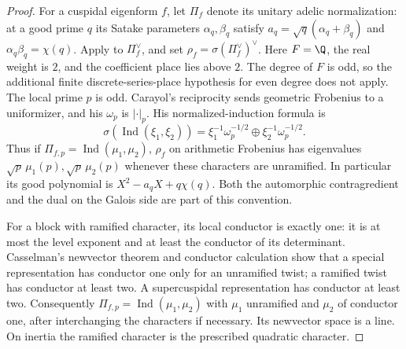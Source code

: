 \begin{proof}
For a cuspidal eigenform $f$, let $\Pi_f$ denote its unitary
adelic normalization: at a good prime $q$ its Satake parameters
$\alpha_q,\beta_q$ satisfy
$a_q=\sqrt q(\alpha_q+\beta_q)$ and
$\alpha_q\beta_q=\chi(q)$.
Apply \cite[\S\S0.3--0.7, Theorem~A, pp.~409--411]{carayol}
to $\Pi_f^\vee$, and set $\rho_f=\sigma(\Pi_f^\vee)^\vee$.
Here $F=\Q$, the real weight is $2$, and the coefficient place
lies above $2$. The degree of $F$ is odd, so the additional
finite discrete-series-place hypothesis for even degree does
not apply. The local prime $p$ is odd.
Carayol's reciprocity sends geometric Frobenius to a uniformizer,
and his $\omega_p$ is $|\cdot|_p$.
His normalized-induction formula is
\[
 \sigma(\operatorname{Ind}(\xi_1,\xi_2))
 =\xi_1^{-1}\omega_p^{-1/2}\oplus
   \xi_2^{-1}\omega_p^{-1/2}.
\]
Thus if $\Pi_{f,p}=\operatorname{Ind}(\mu_1,\mu_2)$,
$\rho_f$ on arithmetic Frobenius has eigenvalues
$\sqrt p\,\mu_1(p),\sqrt p\,\mu_2(p)$ whenever these
characters are unramified. In particular its good polynomial
is $X^2-a_qX+q\chi(q)$. Both the automorphic contragredient and
the dual on the Galois side are part of this convention.

For a block with ramified character, its local conductor is
exactly one: it is at most the level exponent and at least the
conductor of its determinant.
Casselman's newvector theorem and conductor calculation
\cite[Theorem~1, pp.~302--306]{casselman} show that a special
representation has conductor one only for an unramified twist;
a ramified twist has conductor at least two. A supercuspidal
representation has conductor at least two. Consequently
$\Pi_{f,p}=\operatorname{Ind}(\mu_1,\mu_2)$ with $\mu_1$
unramified and $\mu_2$ of conductor one, after interchanging
the characters if necessary. Its newvector space is a line.
On inertia the ramified character is the prescribed quadratic
character.


\end{proof}

